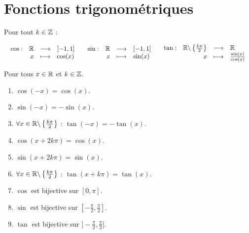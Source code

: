 \section{Fonctions trigonométriques}
\begin{definition}
	Pour tout $k \in \mathbb{Z}$ :	
	\begin{center}
		$
		\begin{array}{ccc}
			\begin{array}{rrcl} \cos : & \mathbb{R} & \longrightarrow & [-1,1] \\ & x & \longmapsto & \cos(x) \end{array}
			&
			\begin{array}{rrcl} \sin : & \mathbb{R} & \longrightarrow & [-1,1] \\ & x & \longmapsto & \sin(x) \end{array}
			&
			\begin{array}{rrcl} \tan : & \mathbb{R} \backslash \left\{ \frac{k \pi}{2} \right\} & \longrightarrow & \mathbb{R} \\ & x & \longmapsto & \frac{\sin(x)}{\cos(x)} \end{array}
		\end{array}
		$
	\end{center}	
\end{definition}

\begin{proposition}
	Pour tous $x \in \mathbb{R}$ et $k \in \mathbb{Z}$.
	\begin{enumerate}
		\item $\cos(-x) = \cos(x)$.
		\item $\sin(-x) = -\sin(x)$.
		\item $\forall x \in \mathbb{R} \backslash \left\{\frac{k\pi}{2}\right\}$ : $\tan(-x) = -\tan(x)$.
		\item $\cos(x + 2k\pi) = \cos(x)$.
		\item $\sin(x + 2k\pi) = \sin(x)$.
		\item $\forall x \in \mathbb{R} \backslash \left\{\frac{k\pi}{2}\right\}$ : $\tan(x + k\pi) = \tan(x)$.
		\item $\cos$ est bijective sur $[0, \pi]$.
		\item $\sin$ est bijective sur $[-\frac{\pi}{2}, \frac{\pi}{2}]$.
		\item $\tan$ est bijective sur $]-\frac{\pi}{2}, \frac{\pi}{2}[$.
	\end{enumerate}
\end{proposition}

